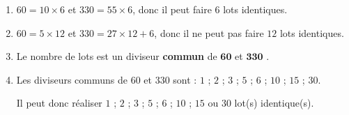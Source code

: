     \begin{enumerate}
        \item $60 = 10\times 6$ et $330 = 55\times 6$, donc il peut faire $6$ lots identiques.
        \item $60 = 5\times 12$ et $330 = 27\times 12 + 6$, donc il ne peut pas faire $12$ lots identiques.
        \item \og Le nombre de lots est un diviseur \textbf{commun} de $\mathbf{60}$ et $\mathbf{330}$ .\fg
        \item Les diviseurs communs de $60$ et $330$ sont : $1$ ; $2$ ; $3$ ; $5$ ; $6$ ; $10$ ; $15$ ; $30$.

        Il peut donc réaliser $1$ ; $2$ ; $3$ ; $5$ ; $6$ ; $10$ ; $15$ ou $30$ lot(s) identique(s).
    \end{enumerate}

